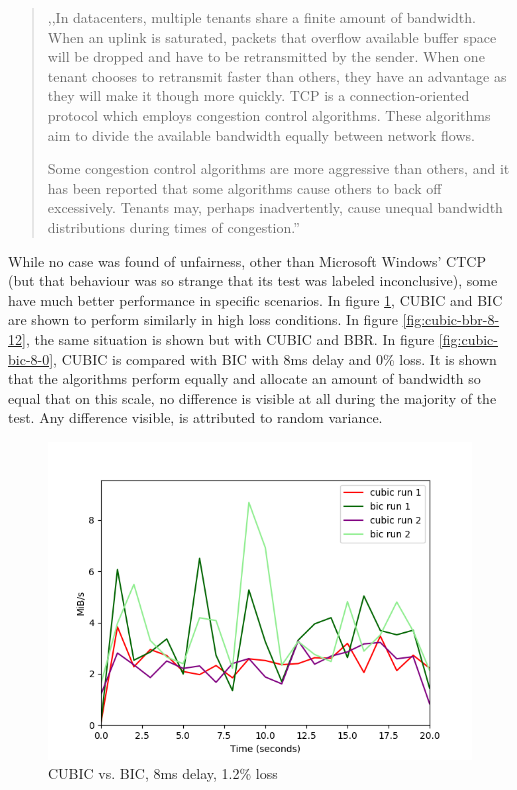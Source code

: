 \documentclass{article}
\begin{document}
\begin{quote}
	,,In datacenters, multiple tenants share a finite amount of bandwidth. When an uplink
	is saturated, packets that overflow available buffer space will be dropped and have to
	be retransmitted by the sender. When one tenant chooses to retransmit faster than
	others, they have an advantage as they will make it though more quickly. TCP is
	a connection-oriented protocol which employs congestion control algorithms. These
	algorithms aim to divide the available bandwidth equally between network flows.

	Some congestion control algorithms are more aggressive than others, and it has been
	reported that some algorithms cause others to back off excessively. Tenants may,
	perhaps inadvertently, cause unequal bandwidth distributions during times of congestion.''
\end{quote}

While no case was found of unfairness, other than Microsoft Windows' CTCP (but
that behaviour was so strange that its test was labeled inconclusive), some
have much better performance in specific scenarios. In figure
\ref{fig:cubic-bic-8-12}, CUBIC and BIC are shown to perform similarly in
high loss conditions. In figure \ref{fig:cubic-bbr-8-12}, the same situation is
shown but with CUBIC and BBR. In figure \ref{fig:cubic-bic-8-0}, CUBIC is
compared with BIC with 8ms delay and 0\% loss. It is shown that the algorithms
perform equally and allocate an amount of bandwidth so equal that on this
scale, no difference is visible at all during the majority of the test. Any
difference visible, is attributed to random variance.

\begin{figure}[H]
	\includegraphics{lab1-group1-task3-question3-1.png}
	\caption{CUBIC vs. BIC, 8ms delay, 1.2\% loss}
	\label{fig:cubic-bic-8-12}
\end{figure}
\end{document}
